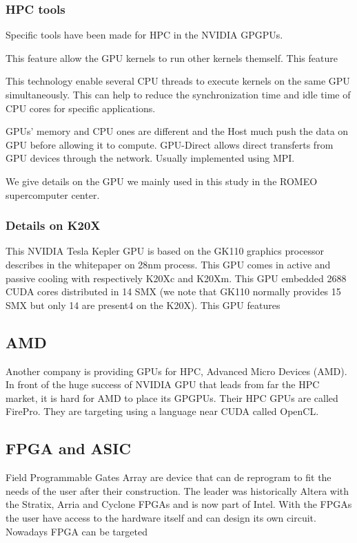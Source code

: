 \subsubsection{HPC tools}
Specific tools have been made for HPC in the NVIDIA GPGPUs. 
\begin{description}
	\item[Dynamic Parallelism] This feature allow the GPU kernels to run other kernels themself. This feature 
	\item[Hyper-Q] This technology enable several CPU threads to execute kernels on the same GPU simultaneously. This can help to reduce the synchronization time and idle time of CPU cores for specific applications.
	\item[NVIDIA GPU-Direct] GPUs' memory and CPU ones are different and the Host much push the data on GPU before allowing it to compute. GPU-Direct allows direct transferts from GPU devices through the network. Usually implemented using MPI.  
\end{description}

We give details on the GPU we mainly used in this study in the ROMEO supercomputer center. 

\subsubsection{Details on K20X}
This NVIDIA Tesla Kepler GPU is based on the GK110 graphics processor describes in the whitepaper\cite{nvidia2012nvidias} on 28nm process.
This GPU comes in active and passive cooling with respectively K20Xc and K20Xm.
This GPU embedded 2688 CUDA cores distributed in 14 SMX (we note that GK110 normally provides 15 SMX but only 14 are present4 on the K20X).
This GPU features 



\subsection{AMD}
Another company is providing GPUs for HPC, Advanced Micro Devices (AMD). 
In front of the huge success of NVIDIA GPU that leads from far the HPC market, it is hard for AMD to place its GPGPUs. 
Their HPC GPUs are called FirePro.
They are targeting using a language near CUDA called OpenCL. 

\subsection{FPGA and ASIC}
Field Programmable Gates Array are device that can de reprogram to fit the needs of the user after their construction.
The leader was historically Altera with the Stratix, Arria and Cyclone FPGAs and is now part of Intel. 
With the FPGAs the user have access to the hardware itself and can design its own circuit. 
Nowadays FPGA can be targeted 

